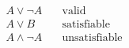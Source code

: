 \documentclass[preview,border=4pt]{standalone}
\begin{document}
\[
\begin{aligned}
        A \lor \neg A &\quad \text{valid}\\
        A \lor B &\quad \text{satisfiable}\\
        A \land \neg A &\quad \text{unsatisfiable}
      \end{aligned}
\]
\end{document}
